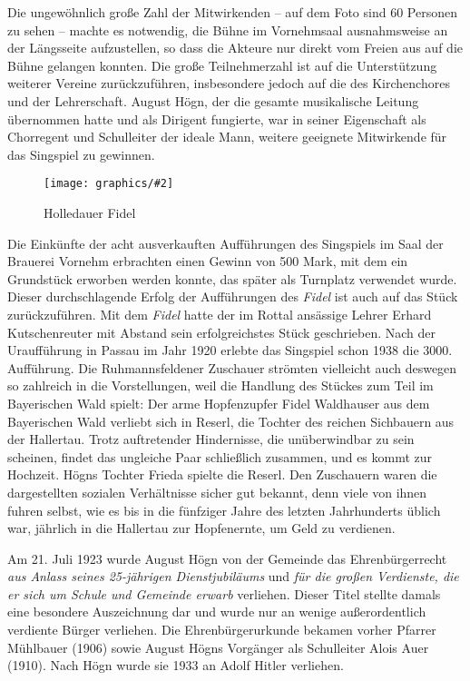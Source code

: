 \documentclass{book}
\newcommand{\zitat}[1]{\textit{#1}}
\newcommand{\img}[2][width=\linewidth]{\noindent\texttt{[image: graphics/\#2]}}
\begin{document}
Die ungewöhnlich große Zahl der Mitwirkenden – auf dem Foto sind 60
Personen zu sehen – machte es notwendig, die Bühne im Vornehmsaal
ausnahmsweise an der Längsseite aufzustellen, so dass die Akteure nur
direkt vom Freien aus auf die Bühne gelangen konnten. Die große
Teilnehmerzahl ist auf die Unterstützung weiterer Vereine
zurückzuführen, insbesondere jedoch auf die des Kirchenchores und der
Lehrerschaft. August Högn, der die gesamte musikalische Leitung
übernommen hatte und als Dirigent fungierte, war in seiner Eigenschaft
als Chorregent und Schulleiter der ideale Mann, weitere geeignete
Mitwirkende für das Singspiel zu gewinnen.

\begin{figure}
\img{Holledauer-Fidel}
\caption{Holledauer Fidel}
\end{figure}

Die Einkünfte der acht ausverkauften Aufführungen des Singspiels im Saal
der Brauerei Vornehm erbrachten einen Gewinn von 500 Mark, mit dem ein
Grundstück erworben werden konnte, das später als Turnplatz verwendet
wurde. Dieser durchschlagende Erfolg der Aufführungen des
\textit{Fidel} ist auch auf das Stück zurückzuführen. Mit dem
\textit{Fidel} hatte der im Rottal ansässige Lehrer Erhard
Kutschenreuter mit Abstand sein erfolgreichstes Stück geschrieben. Nach
der Uraufführung in Passau im Jahr 1920 erlebte das Singspiel schon
1938 die 3000. Aufführung. Die Ruhmannsfeldener Zuschauer strömten
vielleicht auch deswegen so zahlreich in die Vorstellungen, weil die
Handlung des Stückes zum Teil im Bayerischen Wald spielt: Der arme
Hopfenzupfer Fidel Waldhauser aus dem Bayerischen Wald verliebt sich in
Reserl, die Tochter des reichen Sichbauern aus der Hallertau. Trotz
auftretender Hindernisse, die unüberwindbar zu sein scheinen, findet
das ungleiche Paar schließlich zusammen, und es kommt zur Hochzeit.
Högns Tochter Frieda spielte die Reserl. Den Zuschauern waren die
dargestellten sozialen Verhältnisse sicher gut bekannt, denn viele von
ihnen fuhren selbst, wie es bis in die fünfziger Jahre des letzten
Jahrhunderts üblich war, jährlich in die Hallertau zur Hopfenernte, um
Geld zu verdienen.

Am 21. Juli 1923 wurde August Högn von der Gemeinde das
Ehrenbürgerrecht \zitat{aus Anlass seines 25-jährigen
Dienstjubiläums} und \zitat{für die großen Verdienste, die er
sich um Schule und Gemeinde erwarb} verliehen. Dieser Titel stellte
damals eine besondere Auszeichnung dar und wurde nur an wenige
außerordentlich verdiente Bürger verliehen. Die Ehrenbürgerurkunde
bekamen vorher Pfarrer Mühlbauer (1906) sowie August Högns Vorgänger
als Schulleiter Alois Auer (1910). Nach Högn wurde sie 1933 an Adolf
Hitler verliehen.
\end{document}
